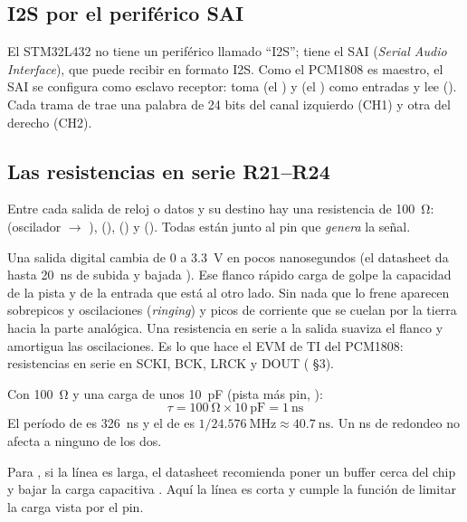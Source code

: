\subsection{I2S por el periférico SAI}

El STM32L432 no tiene un periférico llamado ``I2S''; tiene el SAI (\emph{Serial Audio Interface}), que puede recibir en formato I2S. Como el PCM1808 es maestro, el SAI se configura como esclavo receptor: toma  (el ) y  (el ) como entradas y lee  (). Cada trama de  trae una palabra de 24 bits del canal izquierdo (CH1) y otra del derecho (CH2).

\subsection{Las resistencias en serie R21--R24}

Entre cada salida de reloj o datos y su destino hay una resistencia de \SI{100}{\ohm}:  (oscilador $\to$ ),  (),  () y  (). Todas están junto al pin que \emph{genera} la señal.

\begin{idea}
Una salida digital cambia de 0 a \SI{3.3}{\volt} en pocos nanosegundos (el datasheet da hasta \SI{20}{\nano\second} de subida y bajada ). Ese flanco rápido carga de golpe la capacidad de la pista y de la entrada que está al otro lado. Sin nada que lo frene aparecen sobrepicos y oscilaciones (\emph{ringing}) y picos de corriente que se cuelan por la tierra hacia la parte analógica. Una resistencia en serie a la salida suaviza el flanco y amortigua las oscilaciones. Es lo que hace el EVM de TI del PCM1808: resistencias en serie en SCKI, BCK, LRCK y DOUT ( §3).
\end{idea}

\begin{calculo}
Con \SI{100}{\ohm} y una carga de unos \SI{10}{\pico\farad} (pista más pin, \estimado):
\[
\tau = \SI{100}{\ohm}\times\SI{10}{\pico\farad}=\SI{1}{\nano\second}
\]
El período de  es \SI{326}{\nano\second} y el de  es $1/\SI{24.576}{\mega\hertz}\approx\SI{40.7}{\nano\second}$. Un \si{\nano\second} de redondeo no afecta a ninguno de los dos.
\end{calculo}

Para , si la línea es larga, el datasheet recomienda poner un buffer cerca del chip y bajar la carga capacitiva . Aquí la línea es corta y  cumple la función de limitar la carga vista por el pin.


